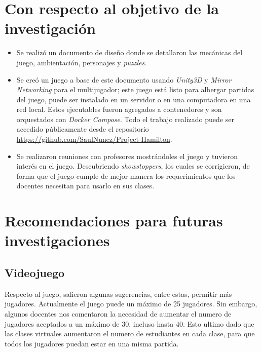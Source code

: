 \section{Con respecto al objetivo de la investigación}
\begin{itemize}
    \item Se realizó un documento de diseño donde se detallaron las mecánicas del juego, ambientación, personajes y \textit{puzzles}.
    \item Se creó un juego a base de este documento usando \textit{Unity3D} y \textit{Mirror Networking} para el multijugador; este juego está listo para albergar partidas del juego, puede ser instalado en un servidor o en una computadora en una red local. Estos ejecutables fueron agregados a contenedores y son orquestados con \textit{Docker Compose}. Todo el trabajo realizado puede ser accedido públicamente desde el repositorio  \url{https://github.com/SaulNunez/Project-Hamilton}.
    \item Se realizaron reuniones con profesores mostrándoles el juego y tuvieron interés en el juego. Descubriendo \textit{showstoppers}, los cuales se corrigieron, de forma que el juego cumple de mejor manera los requerimientos que los docentes necesitan para usarlo en sus clases.
\end{itemize}

\section{Recomendaciones para futuras investigaciones}
\subsection{Videojuego}
Respecto al juego, salieron algunas sugerencias, entre estas, permitir más jugadores. Actualmente el juego puede un máximo de 25 jugadores. Sin embargo, algunos docentes nos comentaron la necesidad de aumentar el numero de jugadores aceptados a un máximo de 30, incluso hasta 40. Esto ultimo dado que las clases virtuales aumentaron el numero de estudiantes en cada clase, para que todos los jugadores puedan estar en una misma partida.

